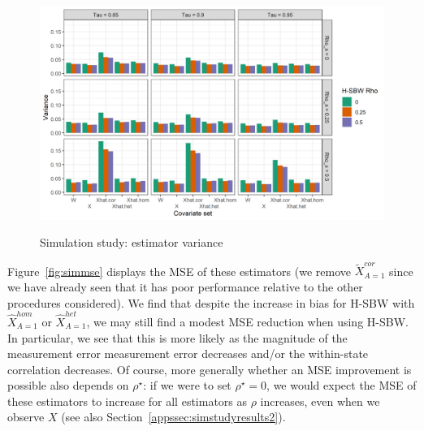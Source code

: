 
\begin{figure}[H]
\begin{center}
    \caption{Simulation study: estimator variance}\label{fig:simvar}
    \label{fig:loveplotc1}
    \includegraphics[scale=0.5]{01_Plots/var-plot.png}
\end{center}
\end{figure}

Figure~\ref{fig:simmse} displays the MSE of these estimators (we remove $\tilde{X}_{A=1}^{cor}$ since we have already seen that it has poor performance relative to the other procedures considered). We find that despite the increase in bias for H-SBW with $\hat{X}_{A=1}^{hom}$ or $\hat{X}_{A=1}^{het}$, we may still find a modest MSE reduction when using H-SBW. In particular, we see that this is more likely as the magnitude of the measurement error measurement error decreases and/or the within-state correlation decreases. Of course, more generally whether an MSE improvement is possible also depends on $\rho^\star$: if we were to set $\rho^\star = 0$, we would expect the MSE of these estimators to increase for all estimators as $\rho$ increases, even when we observe $X$ (see also Section~\ref{appssec:simstudyresults2}).

